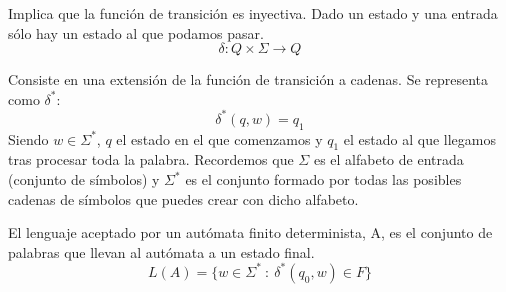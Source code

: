 \documentclass{apuntes}
\begin{document}
\begin{defn}
Implica que la función de transición es inyectiva. Dado un estado y una entrada sólo hay un estado al que podamos pasar.
\[\delta: Q \times \Sigma \rightarrow Q\]
\end{defn}

\begin{defn}
Consiste en una extensión de la función de transición a cadenas. Se representa como $\delta ^*$:
\[\delta^*(q, w)=q_1\]
Siendo $w\in \Sigma ^*$, $q$ el estado en el que comenzamos y $q_1$ el estado al que llegamos tras procesar toda la palabra. Recordemos que $\Sigma$ es el alfabeto de entrada (conjunto de símbolos) y $\Sigma^*$ es el conjunto formado por todas las posibles cadenas de símbolos que puedes crear con dicho alfabeto.
\end{defn}

\begin{defn}
El lenguaje aceptado por un autómata finito determinista, A, es el conjunto de palabras que llevan al autómata a un estado final.
\[L(A) = \lbrace w \in \Sigma^* \ : \ \delta^*(q_0, w) \in F \rbrace\]
\end{defn}
\end{document}
